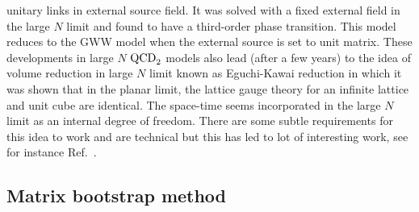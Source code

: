 \documentclass[letter,11pt]{article}
\begin{document}
unitary links in external source field. It was solved with a fixed external field in the large $N$ limit and found to have a 
third-order phase transition. This model reduces to the GWW model when the external source is set to unit matrix. 
These developments in large $N$ $\rm{QCD}_{2}$ models also lead (after a few years) to the idea of volume reduction 
in large $N$ limit known as Eguchi-Kawai reduction \cite{Eguchi:1982nm} in which it was shown that in the planar limit, 
the lattice gauge theory for an infinite lattice and unit cube are identical. The space-time seems incorporated in the large 
$N$ limit as an internal degree of freedom. There are some subtle requirements for this idea to work and are technical 
but this has led to lot of interesting work, see for instance Ref.~\cite{Kovtun:2007py}. 

\subsection{Matrix bootstrap method}
\end{document}
